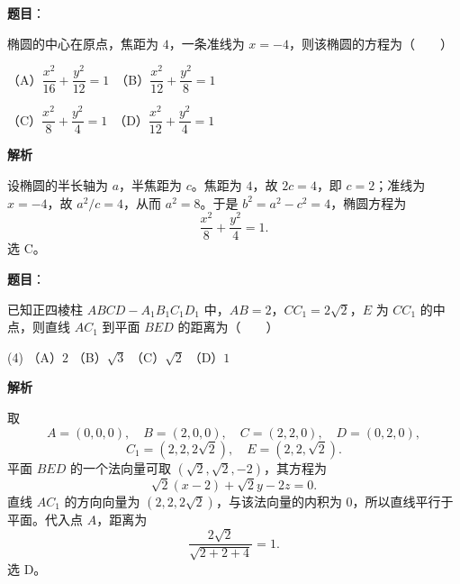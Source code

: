 \begin{answer}

\textbf{题目}：

椭圆的中心在原点，焦距为 $4$，一条准线为 $x=-4$，则该椭圆的方程为\mbox{（　　）}

（A）$\dfrac{x^2}{16}+\dfrac{y^2}{12}=1$　（B）$\dfrac{x^2}{12}+\dfrac{y^2}{8}=1$

（C）$\dfrac{x^2}{8}+\dfrac{y^2}{4}=1$　（D）$\dfrac{x^2}{12}+\dfrac{y^2}{4}=1$

\textbf{解析}

设椭圆的半长轴为 $a$，半焦距为 $c$。焦距为 $4$，故 $2c=4$，即 $c=2$；准线为 $x=-4$，故 $a^2/c=4$，从而 $a^2=8$。于是 $b^2=a^2-c^2=4$，椭圆方程为
\nopagebreak[4]
\[
\frac{x^2}{8}+\frac{y^2}{4}=1.
\]
选 C。


\end{answer}
\begin{answer}

\textbf{题目}：

已知正四棱柱 $ABCD-A_1B_1C_1D_1$ 中，$AB=2$，$CC_1=2\sqrt2$，$E$ 为 $CC_1$ 的中点，则直线 $AC_1$ 到平面 $BED$ 的距离为\mbox{（　　）}

\begin{gkopts}(4)
\task （A）$2$
\task （B）$\sqrt3$
\task （C）$\sqrt2$
\task （D）$1$
\end{gkopts}

\textbf{解析}

取
\nopagebreak[4]
\[
A=(0,0,0),\quad B=(2,0,0),\quad C=(2,2,0),\quad D=(0,2,0),
\]
\nopagebreak[4]
\[
C_1=(2,2,2\sqrt2),\quad E=(2,2,\sqrt2).
\]
平面 $BED$ 的一个法向量可取 $(\sqrt2,\sqrt2,-2)$，其方程为
\nopagebreak[4]
\[
\sqrt2(x-2)+\sqrt2y-2z=0.
\]
直线 $AC_1$ 的方向向量为 $(2,2,2\sqrt2)$，与该法向量的内积为 $0$，所以直线平行于平面。代入点 $A$，距离为
\nopagebreak[4]
\[
\frac{2\sqrt2}{\sqrt{2+2+4}}=1.
\]
选 D。


\end{answer}
